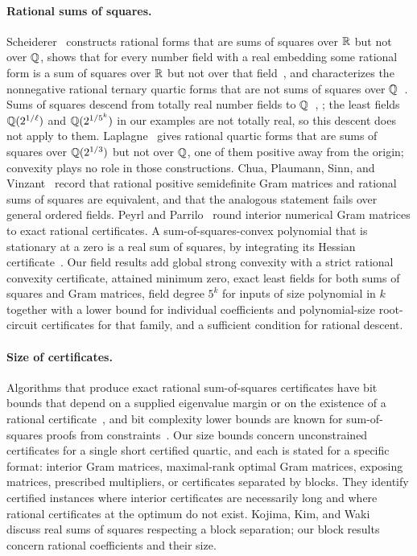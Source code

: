 \paragraph{Rational sums of squares.}
Scheiderer~\cite{Scheiderer2016} constructs rational forms that are sums of
squares over $\mathbb R$ but not over $\mathbb Q$, shows that for every number field with a
real embedding some rational form is a sum of squares over $\mathbb R$ but not over
that field~\cite[Corollary~2.11]{Scheiderer2016}, and characterizes the
nonnegative rational ternary quartic forms that are not sums of squares over
$\mathbb Q$~\cite[Theorem~4.1]{Scheiderer2016}. Sums of squares descend from totally
real number fields to $\mathbb Q$~\cite[Theorem~1.4]{Hillar2009},
\cite[Theorem~1.2]{Scheiderer2016}; the least fields $\mathbb Q(2^{1/\ell})$ and
$\mathbb Q(2^{1/5^k})$ in our examples are not totally real, so this descent does not
apply to them. Laplagne~\cite[Section~3]{Laplagne2024} gives rational quartic
forms that are sums of squares over $\mathbb Q(2^{1/3})$ but not over $\mathbb Q$, one of
them positive away from the origin; convexity plays no role in those
constructions. Chua, Plaumann, Sinn, and
Vinzant~\cite{ChuaPlaumannSinnVinzant2017} record that rational positive
semidefinite Gram matrices and rational sums of squares are equivalent, and
that the analogous statement fails over general ordered fields. Peyrl and
Parrilo~\cite{PeyrlParrilo2008} round interior numerical Gram matrices to
exact rational certificates. A sum-of-squares-convex polynomial that is
stationary at a zero is a real sum of squares, by integrating its Hessian
certificate~\cite{HeltonNie2010,AhmadiParrilo2013,Lasserre2009}. Our field
results add global strong convexity with a strict rational convexity
certificate, attained minimum zero, exact least fields for both sums of
squares and Gram matrices, field degree $5^k$ for inputs of size polynomial in
$k$ together with a lower bound for individual coefficients and
polynomial-size root-circuit certificates for that family, and a sufficient
condition for rational descent.

\paragraph{Size of certificates.}
Algorithms that produce exact rational sum-of-squares certificates have bit
bounds that depend on a supplied eigenvalue margin or on the existence of a
rational certificate~\cite{PeyrlParrilo2008,SafeyElDinZhi2010,
MagronSafeyElDin2021,DavisPapp2022,GaertnerMagronVallentin2026}, and bit
complexity lower bounds are known for sum-of-squares proofs from
constraints~\cite{RaghavendraWeitz2017}. Our size bounds concern unconstrained
certificates for a single short certified quartic, and each is stated for a
specific format: interior Gram matrices, maximal-rank optimal Gram matrices,
exposing matrices, prescribed multipliers, or certificates separated by
blocks. They identify certified instances where interior certificates are
necessarily long and where rational certificates at the optimum do not
exist. Kojima, Kim, and Waki~\cite{KojimaKimWaki2005} discuss real sums of
squares respecting a block separation; our block results concern rational
coefficients and their size.

